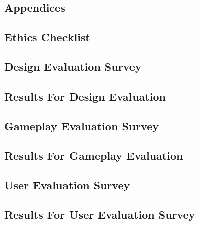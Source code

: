 \documentclass{l4proj}
\begin{document}
%
% 

\begin{appendices}

\chapter{Appendices}

\section{Ethics Checklist}



\section{Design Evaluation Survey}



\section{Results For Design Evaluation}



\section{Gameplay Evaluation Survey}



\section{Results For Gameplay Evaluation}



\section{User Evaluation Survey}



\section{Results For User Evaluation Survey}



\end{appendices}
\end{document}

